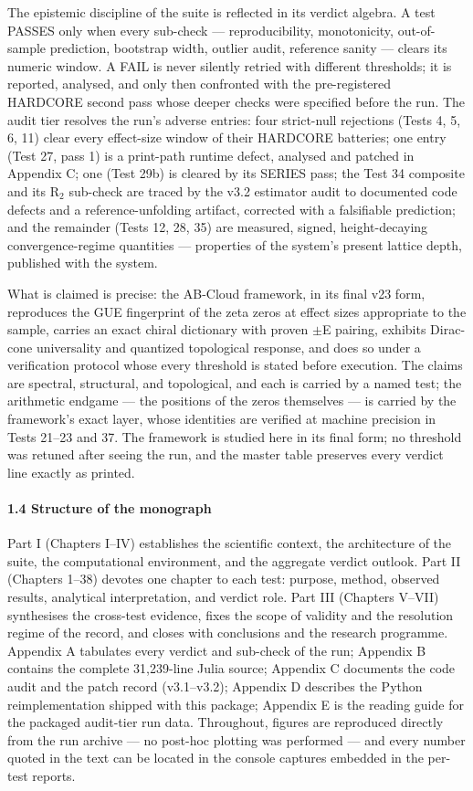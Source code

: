 \documentclass[10pt]{article}
\begin{document}
The epistemic discipline of the suite is reflected in its verdict algebra. A test PASSES only when every sub-check --- reproducibility, monotonicity, out-of-sample prediction, bootstrap width, outlier audit, reference sanity --- clears its numeric window. A FAIL is never silently retried with different thresholds; it is reported, analysed, and only then confronted with the pre-registered HARDCORE second pass whose deeper checks were specified before the run. The audit tier resolves the run's adverse entries: four strict-null rejections (Tests 4, 5, 6, 11) clear every effect-size window of their HARDCORE batteries; one entry (Test 27, pass 1) is a print-path runtime defect, analysed and patched in Appendix C; one (Test 29b) is cleared by its SERIES pass; the Test 34 composite and its R$_2$ sub-check are traced by the v3.2 estimator audit to documented code defects and a reference-unfolding artifact, corrected with a falsifiable prediction; and the remainder (Tests 12, 28, 35) are measured, signed, height-decaying convergence-regime quantities --- properties of the system's present lattice depth, published with the system.

What is claimed is precise: the AB-Cloud framework, in its final v23 form, reproduces the GUE fingerprint of the zeta zeros at effect sizes appropriate to the sample, carries an exact chiral dictionary with proven $\pm$E pairing, exhibits Dirac-cone universality and quantized topological response, and does so under a verification protocol whose every threshold is stated before execution. The claims are spectral, structural, and topological, and each is carried by a named test; the arithmetic endgame --- the positions of the zeros themselves --- is carried by the framework's exact layer, whose identities are verified at machine precision in Tests 21--23 and 37. The framework is studied here in its final form; no threshold was retuned after seeing the run, and the master table preserves every verdict line exactly as printed.

\paragraph{1.4 Structure of the monograph}

Part I (Chapters I--IV) establishes the scientific context, the architecture of the suite, the computational environment, and the aggregate verdict outlook. Part II (Chapters 1--38) devotes one chapter to each test: purpose, method, observed results, analytical interpretation, and verdict role. Part III (Chapters V--VII) synthesises the cross-test evidence, fixes the scope of validity and the resolution regime of the record, and closes with conclusions and the research programme. Appendix A tabulates every verdict and sub-check of the run; Appendix B contains the complete 31,239-line Julia source; Appendix C documents the code audit and the patch record (v3.1--v3.2); Appendix D describes the Python reimplementation shipped with this package; Appendix E is the reading guide for the packaged audit-tier run data. Throughout, figures are reproduced directly from the run archive --- no post-hoc plotting was performed --- and every number quoted in the text can be located in the console captures embedded in the per-test reports.
\end{document}
